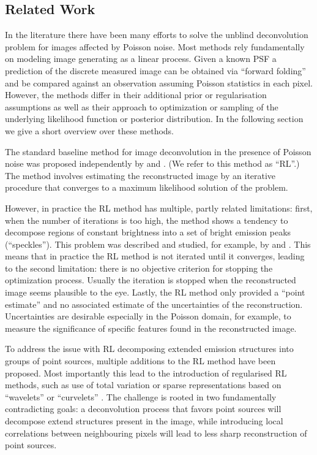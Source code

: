 \documentclass[twocolumn, linenumbers]{aastex631}
\begin{document}
    \subsection{Related Work}
    \label{sec:related}
    In the literature there have been many efforts to solve the unblind deconvolution problem for images affected by Poisson noise. Most methods rely fundamentally on modeling image generating as a linear process. Given a known PSF a prediction of the discrete measured image can be obtained via \enquote{forward folding} and be compared against an observation assuming Poisson statistics in each pixel. However, the methods differ in their additional prior or regularisation assumptions as well as their approach to optimization or sampling of the underlying likelihood function or posterior distribution. In the following section we give a short overview over these methods.
    
    The standard baseline method for image deconvolution in the presence of Poisson noise was proposed independently by \cite{Richardson1972} and \cite{Lucy1974}. (We refer to this method as \enquote{RL}.) The method involves estimating the reconstructed image by an iterative procedure that converges to a maximum likelihood solution of the problem.
    
    However, in practice the RL method has multiple, partly related limitations: first, when the number of iterations is too high, the method shows a tendency to decompose regions of constant brightness into a set of bright emission peaks (\enquote{speckles}). This problem was described and studied, for example,  by \cite{Reeves1995} and \cite{Fish1995}. This means that in practice the RL method is not iterated until it converges, leading to the second limitation: there is no objective criterion for stopping the optimization process. Usually the iteration is stopped when the reconstructed image seems plausible to the eye. 
    Lastly, the RL method only provided a \enquote{point estimate} and no associated estimate of the uncertainties of the reconstruction. Uncertainties are desirable especially in the Poisson domain, for example, to measure the significance of specific features found in the reconstructed image.
    
    To address the issue with RL decomposing extended emission structures into groups of point sources, multiple additions to the RL method  have been proposed. Most importantly this lead to the introduction of regularised RL methods, such as use of total variation \citep{Dey2006} or sparse representations based on \enquote{wavelets} or \enquote{curvelets} \citep{Starck2003}. The challenge is rooted in two fundamentally contradicting goals: a deconvolution process that favors point sources will decompose extend structures present in the image, while introducing local correlations between neighbouring pixels will lead to less sharp reconstruction of point sources.
\end{document}
